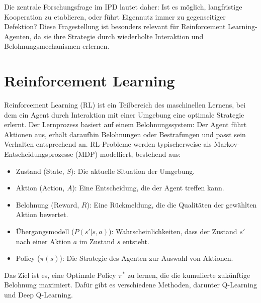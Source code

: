 Die zentrale Forschungsfrage im IPD lautet daher: Ist es möglich, langfristige 
Kooperation zu etablieren, oder führt Eigennutz immer zu gegenseitiger Defektion? 
Diese Fragestellung ist besonders relevant für Reinforcement Learning-Agenten, da 
sie ihre Strategie durch wiederholte Interaktion und Belohnungsmechanismen erlernen.

\section{Reinforcement Learning}
Reinforcement Learning (RL) ist ein Teilbereich des maschinellen Lernens, bei dem 
ein Agent durch Interaktion mit einer Umgebung eine optimale Strategie erlernt. 
Der Lernprozess basiert auf einem Belohnungssystem: Der Agent führt Aktionen aus, 
erhält daraufhin Belohnungen oder Bestrafungen und passt sein Verhalten 
entsprechend an. RL-Probleme werden typischerweise als Markov-Entscheidungsprozesse 
(MDP) modelliert, bestehend aus:
\begin{itemize}
    \item Zustand (State, $S$): Die aktuelle Situation der Umgebung.
    \item Aktion (Action, $A$): Eine Entscheidung, die der Agent treffen kann.
    \item Belohnung (Reward, $R$): Eine Rückmeldung, die die Qualitäten der gewählten Aktion bewertet.
    \item Übergangsmodell ($P(s' \vert s, a)$): Wahrscheinlichkeiten, dass der Zustand $s'$ nach einer Aktion $a$ im Zustand $s$ entsteht.
    \item Policy ($\pi(s)$): Die Strategie des Agenten zur Auswahl von Aktionen.
\end{itemize}
Das Ziel ist es, eine Optimale Policy $\pi^*$ zu lernen, die die kumulierte zukünftige Belohnung maximiert. 
Dafür gibt es verschiedene Methoden, darunter Q-Learning und Deep Q-Learning.


